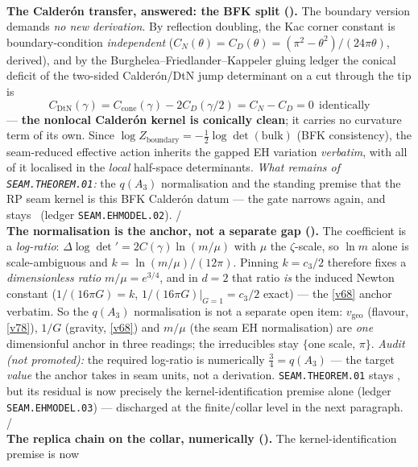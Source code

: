 \documentclass[11pt,a4paper]{article}
\newcommand{\cthree}{c_3}
\begin{document}
\begin{gapbox}
\smallskip\\
\noindent\textbf{The Calder\'on transfer, answered: the BFK split ().} The
boundary version demands \emph{no new derivation}. By reflection doubling, the Kac corner constant is
boundary-condition \emph{independent} ($C_N(\theta)=C_D(\theta)=(\pi^2{-}\theta^2)/(24\pi\theta)$,
derived), and by the Burghelea--Friedlander--Kappeler gluing ledger the conical deficit of the two-sided
Calder\'on/DtN jump determinant on a cut through the tip is
\[
  \boxed{\ C_{\mathrm{DtN}}(\gamma)=C_{\mathrm{cone}}(\gamma)-2C_D(\gamma/2)=C_N-C_D=0\ \ \text{identically}\ }
\]
--- \textbf{the nonlocal Calder\'on kernel is conically clean}; it carries no curvature term of its own.
Since $\log Z_{\mathrm{boundary}}=-\tfrac12\log\det(\mathrm{bulk})$ (BFK consistency), the seam-reduced
effective action inherits the gapped EH variation \emph{verbatim}, with all of it localised in the
\emph{local} half-space determinants. \emph{What remains of \texttt{SEAM.THEOREM.01}:} the $q(A_3)$
normalisation and the standing premise that the RP seam kernel is this BFK Calder\'on datum --- the gate
narrows again, and stays \mO\ (ledger \texttt{SEAM.EHMODEL.02}). \mE/\mO
\smallskip\\
\noindent\textbf{The normalisation is the anchor, not a separate gap ().}
The coefficient is a \emph{log-ratio}: $\Delta\log\det'=2C(\gamma)\ln(m/\mu)$ with $\mu$ the $\zeta$-scale,
so $\ln m$ alone is scale-ambiguous and $k=\ln(m/\mu)/(12\pi)$. Pinning $k=\cthree/2$ therefore fixes a
\emph{dimensionless ratio} $m/\mu=e^{3/4}$, and in $d{=}2$ that ratio \emph{is} the induced Newton constant
($1/(16\pi G)=k$, $1/(16\pi G)|_{G=1}=\cthree/2$ exact) --- the \vref{v68} anchor verbatim. So the
$q(A_3)$ normalisation is not a separate open item: $v_{\mathrm{geo}}$ (flavour, \vref{v78}), $1/G$
(gravity, \vref{v68}) and $m/\mu$ (the seam EH normalisation) are \emph{one} dimensionful anchor in three
readings; the irreducibles stay $\{$one scale, $\pi\}$. \emph{Audit (not promoted):} the required log-ratio
is numerically $\tfrac34=q(A_3)$ --- the target \emph{value} the anchor takes in seam units, not a
derivation. \texttt{SEAM.THEOREM.01} stays \mO, but its residual is now precisely the
kernel-identification premise alone (ledger \texttt{SEAM.EHMODEL.03}) --- discharged at the
finite/collar level in the next paragraph. \mE/\mO
\smallskip\\
\noindent\textbf{The replica chain on the collar, numerically
().} The kernel-identification premise is now

\end{gapbox}
\end{document}
